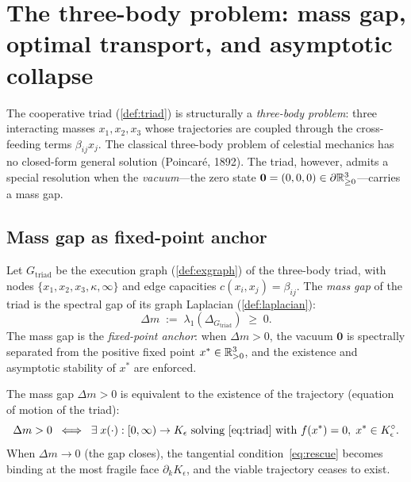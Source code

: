 \section{The three-body problem: mass gap, optimal transport, and
asymptotic collapse}\label{sec:triad-threebody}

The cooperative triad (\cref{def:triad}) is structurally a
\emph{three-body problem}: three interacting masses $x_1, x_2, x_3$
whose trajectories are coupled through the cross-feeding terms
$\beta_{ij}x_j$.  The classical three-body problem of celestial
mechanics has no closed-form general solution (Poincar\'e, 1892).
The triad, however, admits a special resolution when the
\emph{vacuum}---the zero state
$\mathbf{0} = (0,0,0) \in \partial\mathbb{R}^3_{\geq 0}$---carries a
mass gap.

\subsection{Mass gap as fixed-point anchor}

\begin{definition}
\label{def:massgap-anchor}
Let $G_{\mathrm{triad}}$ be the execution graph
(\cref{def:exgraph}) of the three-body triad, with nodes
$\{x_1, x_2, x_3, \kappa, \infty\}$ and edge capacities
$c(x_i, x_j) = \beta_{ij}$.
The \emph{mass gap} of the triad is the spectral gap of its graph
Laplacian (\cref{def:laplacian}):
\[
  \Delta m \;:=\; \lambda_1(\Delta_{G_{\mathrm{triad}}}) \;\geq\; 0.
\]
The mass gap is the \emph{fixed-point anchor}: when $\Delta m > 0$,
the vacuum $\mathbf{0}$ is spectrally separated from the positive
fixed point $x^* \in \mathbb{R}^3_{>0}$, and the existence and asymptotic
stability of $x^*$ are enforced.
\end{definition}

\begin{proposition}[Mass gap $=$ equation of motion]
\label{prop:massgap-eom}
The mass gap $\Delta m > 0$ is equivalent to the existence of the
trajectory (equation of motion of the triad):
\[
  \Delta m > 0
  \;\iff\;
  \exists\; x(\cdot): [0,\infty) \to K_\epsilon
  \text{ solving \eqref{eq:triad} with }
  f(x^*) = 0,\; x^* \in K_\epsilon^\circ.
\]
When $\Delta m \to 0$ (the gap closes), the tangential
condition~\eqref{eq:rescue} becomes binding at the most fragile
face $\partial_k K_\epsilon$, and the viable trajectory ceases to
exist.
\end{proposition}

